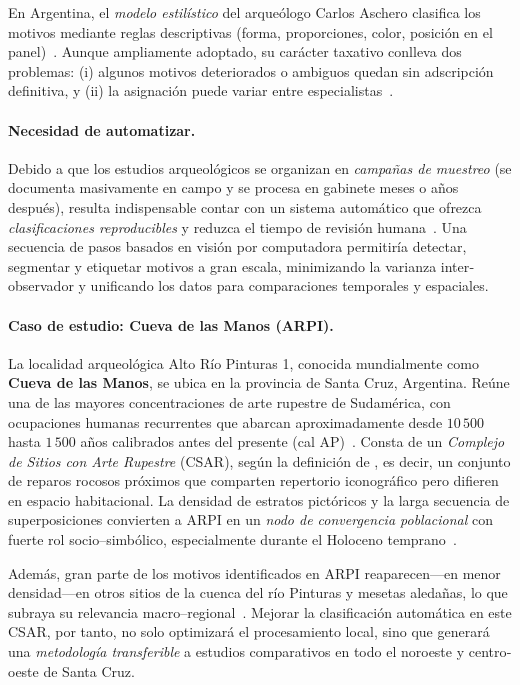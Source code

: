En Argentina, el \emph{modelo estilístico} del arqueólogo Carlos Aschero clasifica los motivos mediante reglas descriptivas (forma, proporciones, color, posición en el panel)~\cite{aschero2000,aschero2012}.
Aunque ampliamente adoptado, su carácter taxativo conlleva dos problemas:
(i) algunos motivos deteriorados o ambiguos quedan sin adscripción definitiva, y
(ii) la asignación puede variar entre especialistas~\cite{aschero1998}.

\paragraph{Necesidad de automatizar.}
Debido a que los estudios arqueológicos se organizan en \emph{campañas de muestreo} (se documenta masivamente en campo y se procesa en gabinete meses o años después), resulta indispensable contar con un sistema automático que ofrezca \emph{clasificaciones reproducibles} y reduzca el tiempo de revisión humana~\cite{aschero1998}.
Una secuencia de pasos basados en visión por computadora permitiría detectar, segmentar y etiquetar motivos a gran escala, minimizando la varianza inter‐observador y unificando los datos para comparaciones temporales y espaciales.

\paragraph{Caso de estudio: Cueva de las Manos (ARPI).}
La localidad arqueológica Alto Río Pinturas 1, conocida mundialmente como \textbf{Cueva de las Manos}, se ubica en la provincia de Santa Cruz, Argentina.
Reúne una de las mayores concentraciones de arte rupestre de Sudamérica, con ocupaciones humanas recurrentes que abarcan aproximadamente desde \(10\,500\) hasta \(1\,500\) años calibrados antes del presente (cal AP)~\cite{gradin1976}.
Consta de un \emph{Complejo de Sitios con Arte Rupestre} (CSAR), según la definición de \citet{aschero1996}, es decir, un conjunto de reparos rocosos próximos que comparten repertorio iconográfico pero difieren en espacio habitacional.
La densidad de estratos pictóricos y la larga secuencia de superposiciones convierten a ARPI en un \emph{nodo de convergencia poblacional} con fuerte rol socio–simbólico, especialmente durante el Holoceno temprano~\cite{gradin1987,aschero2021,aschero2023}.

Además, gran parte de los motivos identificados en ARPI reaparecen—en menor densidad—en otros sitios de la cuenca del río Pinturas y mesetas aledañas, lo que subraya su relevancia macro–regional~\cite{dincauze1987,dincauze2000}.
Mejorar la clasificación automática en este CSAR, por tanto, no solo optimizará el procesamiento local, sino que generará una \emph{metodología transferible} a estudios comparativos en todo el noroeste y centro‐oeste de Santa Cruz.

